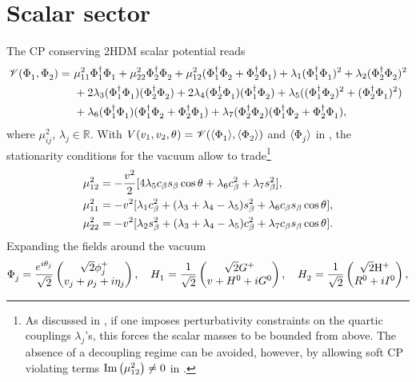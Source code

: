 \documentclass[12pt,a4paper]{article}
\begin{document}
\appendix
\section{Scalar sector\label{APP:Scalar}}
The CP conserving 2HDM scalar potential reads
\begin{equation}\label{eq:2HDMpotCP:00}
\begin{aligned}
 \mathscr V(\SD{1},\SD{2})=\ 
 &\mu_{11}^2\SDd{1}\SD{1}+\mu_{22}^2\SDd{2}\SD{2}+\mu_{12}^2(\SDd{1}\SD{2}+\SDd{2}\SD{1})+\lambda_1(\SDd{1}\SD{1})^2+\lambda_2(\SDd{2}\SD{2})^2\\
 &+2\lambda_3(\SDd{1}\SD{1})(\SDd{2}\SD{2})+2\lambda_4(\SDd{2}\SD{1})(\SDd{1}\SD{2})+\lambda_5((\SDd{1}\SD{2})^2+(\SDd{2}\SD{1})^2)\\
 &+\lambda_6(\SDd{1}\SD{1})(\SDd{1}\SD{2}+\SDd{2}\SD{1})+\lambda_7(\SDd{2}\SD{2})(\SDd{1}\SD{2}+\SDd{2}\SD{1}),
\end{aligned}
\end{equation}
where $\mu_{ij}^2$, $\lambda_j\in\mathbb{R}$. With $V(\vev{1},\vev{2},\vevPh{})= \mathscr V(\VEV{\SD{1}},\VEV{\SD{2}})$ and $\VEV{\SD{j}}$ in , the stationarity conditions for the vacuum allow to trade\footnote{As discussed in \cite{Nebot:2019qvr}, if one imposes perturbativity constraints on the quartic couplings $\lambda_j$'s, this forces the scalar masses to be bounded from above. The absence of a decoupling regime can be avoided, however, by allowing soft CP violating terms $\text{Im}\left(\mu_{12}^2\right)\neq 0$ in .}
\begin{equation}
 \begin{aligned}
 & \mu_{12}^2=-\frac{v_{}^2}{2}[4\lambda_5c_\beta s_\beta\cos\theta_{}+\lambda_6c_\beta^2+\lambda_7s_\beta^2],\\  
 & \mu_{11}^2=-v_{}^2[\lambda_1c_\beta^2+(\lambda_3+\lambda_4-\lambda_5)s_\beta^2+\lambda_6c_\beta s_\beta\cos\theta_{}],\\
 & \mu_{22}^2=-v_{}^2[\lambda_2s_\beta^2+(\lambda_3+\lambda_4-\lambda_5)c_\beta^2+\lambda_7c_\beta s_\beta\cos\theta_{}].
 \end{aligned}
\end{equation}
Expanding the fields around the vacuum
\begin{equation}
\SD{j}=\frac{e^{i\vevPh{j}}}{\sqrt 2}\begin{pmatrix}\sqrt{2}\phi_j^+\\ \vev{j}+\rho_j+i\eta_j\end{pmatrix},\quad
\HSD{1}=\frac{1}{\sqrt{2}}\begin{pmatrix}\sqrt{2}G^+\\ \vev{}+\nsH+iG^0\end{pmatrix},\quad 
\HSD{2}=\frac{1}{\sqrt{2}}\begin{pmatrix}\sqrt{2}\cHp\\ \nsR+i\nsI\end{pmatrix},
\end{equation}
\end{document}
